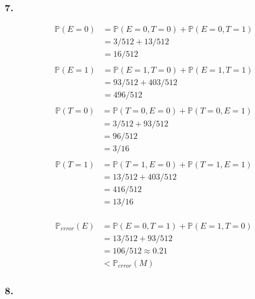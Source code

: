 \documentclass{article}
\newcommand{\1}{\mathbf{1}}
\renewcommand{\P}{\mathbb{P}}
\begin{document}
\subsubsection{7.}

\begin{align*}
  \P(E = 0)
   & = \P(E = 0, T = 0) + \P(E = 0, T = 1) \\
   & = 3/512 + 13/512                      \\
   & = 16/512                              \\
\end{align*}
\begin{align*}
  \P(E = 1)
   & = \P(E = 1, T = 0) + \P(E = 1, T = 1) \\
   & = 93/512 + 403/512                    \\
   & = 496/512                             \\
\end{align*}
\begin{align*}
  \P(T = 0)
   & = \P(T = 0, E = 0) + \P(T = 0, E = 1) \\
   & = 3/512 + 93/512                      \\
   & = 96/512                              \\
   & = 3/16                                \\
\end{align*}
\begin{align*}
  \P(T = 1)
   & = \P(T = 1, E = 0) + \P(T = 1, E = 1) \\
   & = 13/512 + 403/512                    \\
   & = 416/512                             \\
   & = 13/16                               \\
\end{align*}

\begin{align*}
  \P_{error}(E)
   & =\P(E = 0, T = 1) + \P(E = 1, T = 0) \\
   & = 13/512 + 93/512                    \\
   & = 106/512 \approx 0.21               \\
   & < \P_{error}(M)
\end{align*}

\subsubsection{8.}
\end{document}
